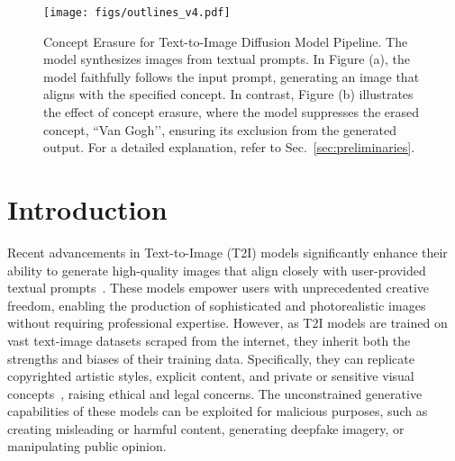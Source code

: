 \begin{figure}[t]
    \centering
    \texttt{[image: figs/outlines\_v4.pdf]}
    \caption{ Concept Erasure for Text-to-Image Diffusion Model Pipeline. The model synthesizes images from textual prompts. In Figure (a), the model faithfully follows the input prompt, generating an image that aligns with the specified concept. In contrast, Figure (b) illustrates the effect of concept erasure, where the model suppresses the erased concept, ``Van Gogh’’, ensuring its exclusion from the generated output. For a detailed explanation, refer to Sec.~\ref{sec:preliminaries}.
    }
    \label{fig:overview}
\end{figure}





\section{Introduction}

Recent advancements in Text-to-Image (T2I) models significantly enhance their ability to generate high-quality images that align closely with user-provided textual prompts~\cite{stable_diffusion}. These models empower users with unprecedented creative freedom, enabling the production of sophisticated and photorealistic images without requiring professional expertise. However, as T2I models are trained on vast text-image datasets scraped from the internet, they inherit both the strengths and biases of their training data. Specifically, they can replicate copyrighted artistic styles, explicit content, and private or sensitive visual concepts~\cite{Somepalli2023UnderstandingAM,Somepalli2022DiffusionAO},
raising ethical and legal concerns. The unconstrained generative capabilities of these models can be exploited for malicious purposes, such as creating misleading or harmful content, generating deepfake imagery, or manipulating public opinion.

